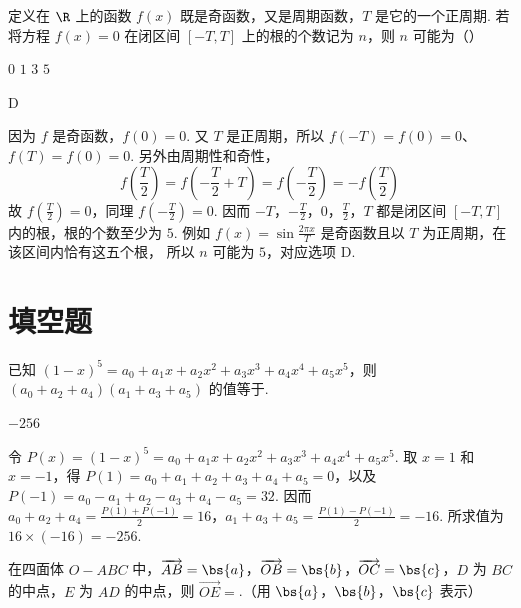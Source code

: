 \begin{problem}
定义在 \(\R\) 上的函数 \(f(x)\) 既是奇函数，又是周期函数，\(T\) 是它的一个正周期. 若将方程 \(f(x) = 0\) 在闭区间 \([-T, T]\) 上的根的个数记为 \(n\)，则 \(n\) 可能为（\quad）

\choices
    {\(0\)}
    {\(1\)}
    {\(3\)}
    {\(5\)}
\end{problem}

\begin{answer}
D
\end{answer}

\begin{solution}
因为 \(f\) 是奇函数，\(f(0)=0\). 又 \(T\) 是正周期，所以
\(f(-T)=f(0)=0\)、\(f(T)=f(0)=0\). 另外由周期性和奇性，
\[
f\left(\frac T2\right)=f\left(-\frac T2+T\right)=f\left(-\frac T2\right)
= -f\left(\frac T2\right)
\]
故 \(f\left(\frac T2\right)=0\)，同理 \(f\left(-\frac T2\right)=0\). 因而
\(-T\)，\(-\frac T2\)，\(0\)，\(\frac T2\)，\(T\) 都是闭区间 \([-T,T]\) 内的根，根的个数至少为
\(5\). 例如 \(f(x)=\sin\frac{2\pi x}{T}\) 是奇函数且以 \(T\) 为正周期，在该区间内恰有这五个根，
所以 \(n\) 可能为 \(5\)，对应选项 D.
\end{solution}

\section{填空题}

\begin{problem}
已知 \( (1 - x)^{5} = a_{0} + a_{1}x + a_{2}x^{2} + a_{3}x^{3} + a_{4}x^{4} + a_{5}x^{5} \)，则 \( (a_{0} + a_{2} + a_{4})(a_{1} + a_{3} + a_{5}) \) 的值等于\fillinblank{}.
\end{problem}

\begin{answer}
\(-256\)
\end{answer}

\begin{solution}
令 \(P(x)=(1-x)^{5}=a_{0}+a_{1}x+a_{2}x^{2}+a_{3}x^{3}+a_{4}x^{4}+a_{5}x^{5}\). 取
\(x=1\) 和 \(x=-1\)，得
\(P(1)=a_{0}+a_{1}+a_{2}+a_{3}+a_{4}+a_{5}=0\)，以及
\(P(-1)=a_{0}-a_{1}+a_{2}-a_{3}+a_{4}-a_{5}=32\). 因而
\(a_{0}+a_{2}+a_{4}=\frac{P(1)+P(-1)}2=16\)，\(a_{1}+a_{3}+a_{5}=\frac{P(1)-P(-1)}2=-16\).
所求值为 \(16\times(-16)=-256\).
\end{solution}

\begin{problem}
在四面体 \(O - ABC\) 中，\(\overrightarrow{AB} = \bs{a}\)，\(\overrightarrow{OB} = \bs{b}\)，\(\overrightarrow{OC} = \bs{c}\)，\(D\) 为 \(BC\) 的中点，\(E\) 为 \(AD\) 的中点，则 \(\overrightarrow{OE} =\)\fillinblank{}.（用 \(\bs{a}\)，\(\bs{b}\)，\(\bs{c}\) 表示）
\end{problem}


